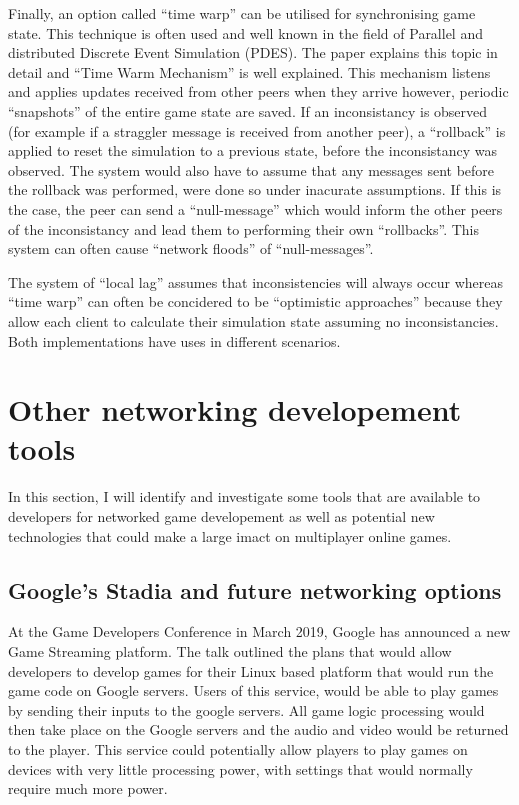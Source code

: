 Finally, an option called ``time warp'' can be utilised for synchronising game state. This technique is often used and well known in the field of Parallel and distributed Discrete Event Simulation (PDES). The paper  explains this topic in detail and ``Time Warm Mechanism'' is well explained. This mechanism listens and applies updates received from other peers when they arrive however, periodic ``snapshots'' of the entire game state are saved. If an inconsistancy is observed (for example if a straggler message is received from another peer), a ``rollback'' is applied to reset the simulation to a previous state, before the inconsistancy was observed. The system would also have to assume that any messages sent before the rollback was performed, were done so under inacurate assumptions. If this is the case, the peer can send a ``null-message'' which would inform the other peers of the inconsistancy and lead them to performing their own ``rollbacks''. This system can often cause ``network floods'' of ``null-messages''.

The system of ``local lag'' assumes that inconsistencies will always occur whereas ``time warp'' can often be concidered to be ``optimistic approaches'' because they allow each client to calculate their simulation state assuming no inconsistancies. Both implementations have uses in different scenarios.

\section{Other networking developement tools}
In this section, I will identify and investigate some tools that are available to developers for networked game developement as well as potential new technologies that could make a large imact on multiplayer online games.


\subsection{Google's Stadia and future networking options}
At the Game Developers Conference in March 2019, Google has announced a new Game Streaming platform. The talk outlined the plans that would allow developers to develop games for their Linux based platform that would run the game code on Google servers. Users of this service, would be able to play games by sending their inputs to the google servers. All game logic processing would then take place on the Google servers and the audio and video would be returned to the player. This service could potentially allow players to play games on devices with very little processing power, with settings that would normally require much more power.

